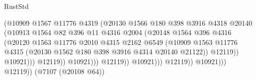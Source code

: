 \begin{lexlean}{RustStd}
\begin{coremodule}
                                        (@10909
                                          @1567
                                          @11776
                                          @4319
                                          (@20130
                                            @1566
                                            @180
                                            @398
                                            @3916
                                            @4318
                                            @20140
                                            (@10913
                                              @1564
                                              @82
                                              @396
                                              @11
                                              @4316
                                              @2004
                                              (@20148
                                                @1564
                                                @396
                                                @4316
                                                (@20120
                                                  @1563
                                                  @11776
                                                  @2010
                                                  @4315
                                                  @2162
                                                  @6549
                                                  (@10909
                                                    @1563
                                                    @11776
                                                    @4315
                                                    (@20130
                                                      @1562
                                                      @180
                                                      @398
                                                      @3916
                                                      @4314
                                                      @20140
                                                      @21122))
                                                  @12119))
                                              @10921)))
                                        @12119))
                                    @10921)))
                              @12119))
                          @10921)))
                    @12119))
                @10921)))
          @12119))
      (@7107 (@20108 @64))

\end{coremodule}
\end{lexlean}
